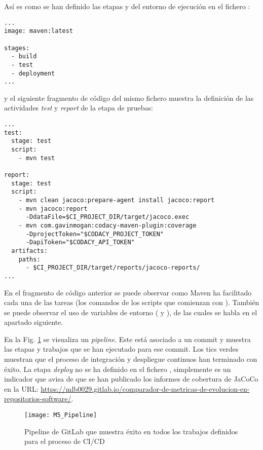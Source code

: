 Así es como se han definido las etapas y del entorno de ejecución en el fichero :\\
\begin{minipage}{\linewidth}
{\tiny
\begin{lstlisting}[breaklines]
...
image: maven:latest

stages:
  - build
  - test
  - deployment
...
\end{lstlisting}
}
\end{minipage}
y el siguiente fragmento de código del mismo fichero muestra la definición de las actividades \textit{test} y \textit{report} de la etapa de pruebas:\\
\begin{minipage}{\linewidth}
{\tiny
\begin{lstlisting}[breaklines]
...
test:
  stage: test
  script:
	- mvn test

report:
  stage: test
  script:
	- mvn clean jacoco:prepare-agent install jacoco:report
	- mvn jacoco:report 
	  -DdataFile=$CI_PROJECT_DIR/target/jacoco.exec
	- mvn com.gavinmogan:codacy-maven-plugin:coverage 
	  -DprojectToken="$CODACY_PROJECT_TOKEN" 
	  -DapiToken="$CODACY_API_TOKEN"
  artifacts:
	paths:
	  - $CI_PROJECT_DIR/target/reports/jacoco-reports/
...		
\end{lstlisting}
}
\end{minipage}

En el fragmento de código anterior se puede observar como Maven ha facilitado cada una de las tareas (los comandos de los scripts que comienzan con ). También se puede observar el uso de variables de entorno ( y ), de las cuales se habla en el apartado siguiente.

 En la Fig. \ref{fig:M5_Pipeline} se visualiza un \textit{pipeline}. Este está asociado a un commit y muestra las etapas y trabajos que se han ejecutado para ese commit. Los tics verdes muestran que el proceso de integración y despliegue continuos han terminado con éxito. La etapa \textit{deploy} no se ha definido en el fichero , simplemente es un indicador que avisa de que se han publicado los informes de cobertura de JaCoCo en la URL: \url{https://mlb0029.gitlab.io/comparador-de-metricas-de-evolucion-en-repositorios-software/}.
 
 \begin{figure}[!h]
 	\centering
 	\texttt{[image: M5\_Pipeline]}
 	\caption{Pipeline de GitLab que muestra éxito en todos los trabajos definidos para el proceso de CI/CD}\label{fig:M5_Pipeline}
 \end{figure}
 \FloatBarrier
 
